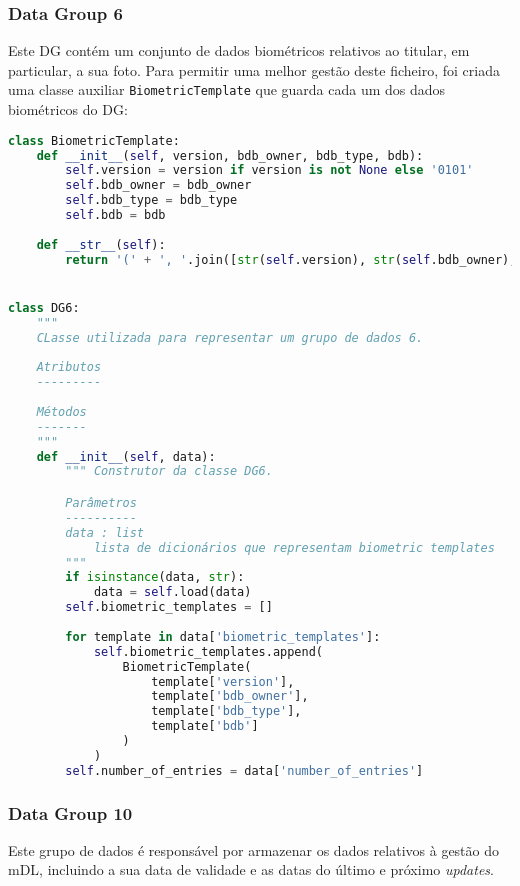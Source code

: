 \subsubsection{Data Group 6}

Este DG contém um conjunto de dados biométricos relativos ao titular, em particular, a sua foto. Para permitir uma melhor gestão deste ficheiro, foi criada uma classe auxiliar \texttt{BiometricTemplate} que guarda cada um dos dados biométricos do DG:

\begin{lstlisting}[caption=Instanciação dos dados do DG6, recorrendo à classe auxiliar, language=Python]
class BiometricTemplate:
    def __init__(self, version, bdb_owner, bdb_type, bdb):
        self.version = version if version is not None else '0101'
        self.bdb_owner = bdb_owner
        self.bdb_type = bdb_type
        self.bdb = bdb
    
    def __str__(self):
        return '(' + ', '.join([str(self.version), str(self.bdb_owner), str(self.bdb_type), str(self.bdb)[:20] + '...']) + ')'


class DG6:
    """
    CLasse utilizada para representar um grupo de dados 6.
    
    Atributos
    ---------
    
    Métodos
    -------
    """
    def __init__(self, data):
        """ Construtor da classe DG6.

        Parâmetros
        ----------
        data : list
            lista de dicionários que representam biometric templates
        """
        if isinstance(data, str):
            data = self.load(data)
        self.biometric_templates = []
        
        for template in data['biometric_templates']:
            self.biometric_templates.append(
                BiometricTemplate(
                    template['version'],
                    template['bdb_owner'],
                    template['bdb_type'],
                    template['bdb']
                )
            )
        self.number_of_entries = data['number_of_entries']
\end{lstlisting}


\subsubsection{Data Group 10}

Este grupo de dados é responsável por armazenar os dados relativos à gestão do mDL, incluindo a sua data de validade e as datas do último e próximo \textit{updates}.

